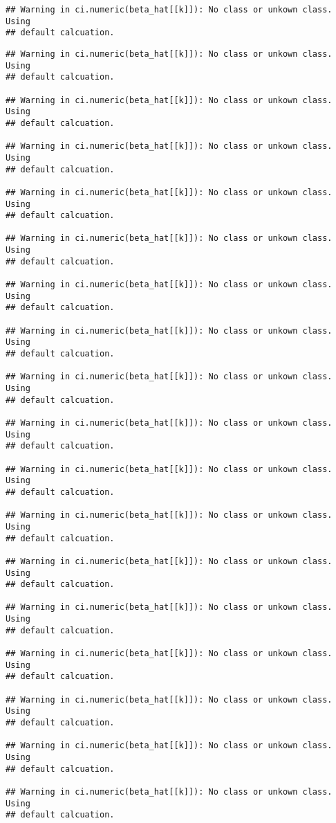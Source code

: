 \documentclass[]{article}
\begin{document}
\begin{verbatim}
## Warning in ci.numeric(beta_hat[[k]]): No class or unkown class. Using
## default calcuation.
\end{verbatim}

\begin{verbatim}
## Warning in ci.numeric(beta_hat[[k]]): No class or unkown class. Using
## default calcuation.

## Warning in ci.numeric(beta_hat[[k]]): No class or unkown class. Using
## default calcuation.

## Warning in ci.numeric(beta_hat[[k]]): No class or unkown class. Using
## default calcuation.

## Warning in ci.numeric(beta_hat[[k]]): No class or unkown class. Using
## default calcuation.

## Warning in ci.numeric(beta_hat[[k]]): No class or unkown class. Using
## default calcuation.

## Warning in ci.numeric(beta_hat[[k]]): No class or unkown class. Using
## default calcuation.

## Warning in ci.numeric(beta_hat[[k]]): No class or unkown class. Using
## default calcuation.

## Warning in ci.numeric(beta_hat[[k]]): No class or unkown class. Using
## default calcuation.

## Warning in ci.numeric(beta_hat[[k]]): No class or unkown class. Using
## default calcuation.

## Warning in ci.numeric(beta_hat[[k]]): No class or unkown class. Using
## default calcuation.

## Warning in ci.numeric(beta_hat[[k]]): No class or unkown class. Using
## default calcuation.

## Warning in ci.numeric(beta_hat[[k]]): No class or unkown class. Using
## default calcuation.

## Warning in ci.numeric(beta_hat[[k]]): No class or unkown class. Using
## default calcuation.

## Warning in ci.numeric(beta_hat[[k]]): No class or unkown class. Using
## default calcuation.

## Warning in ci.numeric(beta_hat[[k]]): No class or unkown class. Using
## default calcuation.

## Warning in ci.numeric(beta_hat[[k]]): No class or unkown class. Using
## default calcuation.

## Warning in ci.numeric(beta_hat[[k]]): No class or unkown class. Using
## default calcuation.


\end{verbatim}
\end{document}
